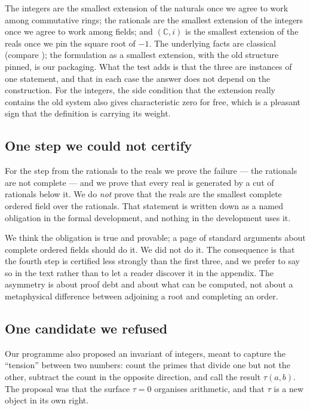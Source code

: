 \documentclass[aps,prd,preprint,superscriptaddress,amsmath,amssymb]{revtex4-2}
\begin{document}
The integers are the smallest extension of the naturals once we agree to work among
commutative rings; the rationals are the smallest extension of the integers once we
agree to work among fields; and $(\mathbb{C},i)$ is the smallest extension of the
reals once we pin the square root of $-1$.  The underlying facts are classical (compare \cite{ebb}); the formulation as a
smallest extension, with the old structure pinned, is our packaging.  What the
test adds is that the three are instances of one statement, and that in each case
the answer does not depend on the construction.  For the integers, the
side condition that the extension really contains the old system also gives
characteristic zero for free, which is a pleasant sign that the definition is
carrying its weight.

\subsection{One step we could not certify}
\label{sec:real}

For the step from the rationals to the reals we prove the failure --- the rationals
are not complete --- and we prove that every real is generated by a cut of
rationals below it.  We do \emph{not} prove that the reals are the smallest
complete ordered field over the rationals.  That statement is written down as a
named obligation in the formal development, and nothing in the development uses
it.

We think the obligation is true and provable; a page of standard arguments about
complete ordered fields should do it.  We did not do it.  The consequence is that
the fourth step is certified less strongly than the first three, and we prefer to
say so in the text rather than to let a reader discover it in the appendix.  The
asymmetry is about proof debt and about what can be computed, not about a
metaphysical difference between adjoining a root and completing an order.

\subsection{One candidate we refused}
\label{sec:counting}

Our programme also proposed an invariant of integers, meant to capture the
``tension'' between two numbers: count the primes that divide one but not the
other, subtract the count in the opposite direction, and call the result
$\tau(a,b)$.  The proposal was that the surface $\tau=0$ organises arithmetic, and
that $\tau$ is a new object in its own right.
\end{document}
